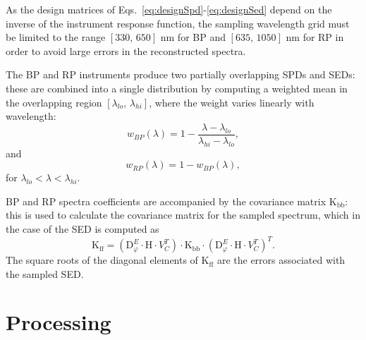 \documentclass{aa}
\newcommand{\xp}{BP and RP\xspace}
\newcommand{\equrefs}[2]{Eqs.~\ref{eq:#1}-\ref{eq:#2}}
\begin{document}
As the design matrices of \equrefs{designSpd}{designSed} depend on the inverse of the instrument response function, the sampling wavelength grid must be limited to the range $[330, \, 650]$ nm for BP and $[635, \, 1050]$ nm for RP in order to avoid large errors in the reconstructed
spectra.
\par
The  \xp instruments produce two partially overlapping SPDs and SEDs: these are combined into a single distribution by
computing a weighted mean in the overlapping region $[\lambda_{lo},\, \lambda_{hi}]$, 
where the weight varies linearly with wavelength: 
\begin{equation}
    w_{BP}(\lambda) = 1 - \frac{\lambda - \lambda_{lo}}{\lambda_{hi} - \lambda_{lo}}
,\end{equation}
and
\begin{equation}
    w_{RP}(\lambda) = 1 - w_{BP}(\lambda)
,\end{equation}
for $\lambda_{lo} < \lambda < \lambda_{hi}$.
\par
\xp spectra coefficients are accompanied by the covariance matrix $\mathrm{K_{bb}}$: this is used to calculate the covariance matrix for the sampled spectrum, which in the case of the SED is computed as
\begin{equation}
   \mathrm{K_{ff}} = \left(\mathrm{D}_\varphi^E \cdot \mathrm{H} \cdot V_C^T\right) \cdot \mathrm{K_{bb}}  \cdot \left(\mathrm{D}_\varphi^E \cdot \mathrm{H} \cdot V_C^T\right)^T
   \label{eq:ecsCovMatrix}
.\end{equation}
The square roots of the diagonal elements of $\mathrm{K_{ff}}$ are the errors associated with the sampled SED.


\section{Processing}\label{sec:processing}
\end{document}
